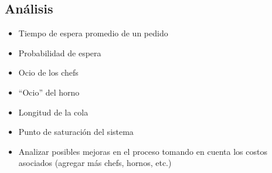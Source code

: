 \documentclass[
]{article}
\providecommand{\tightlist}{%
  \setlength{\itemsep}{0pt}\setlength{\parskip}{0pt}}
\begin{document}
\subsection{Análisis}\label{anuxe1lisis}

\begin{itemize}
\tightlist
\item
  Tiempo de espera promedio de un pedido
\item
  Probabilidad de espera
\item
  Ocio de los chefs
\item
  ``Ocio'' del horno
\item
  Longitud de la cola
\item
  Punto de saturación del sistema
\item
  Analizar posibles mejoras en el proceso tomando en cuenta los costos
  asociados (agregar más chefs, hornos, etc.)
\end{itemize}
\end{document}
